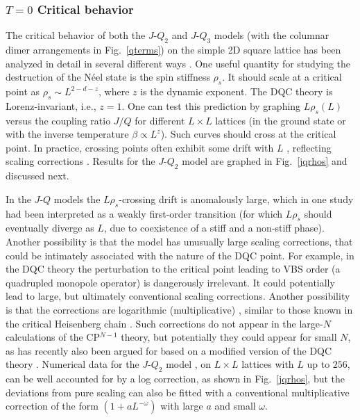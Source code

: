 \documentclass[10pt,pre,aps,twocolumn,showpacs,subscriptaddresses,floatfix]{revtex4}
\begin{document}
\subsubsection{$T=0$ Critical behavior}

The critical behavior of both the $J$-$Q_2$ and $J$-$Q_3$ models (with the columnar dimer arrangements in Fig.~\ref{qterms}) on the simple 2D square 
lattice has been analyzed in detail in several different ways \cite{Sandvik07,Jiang08,kaul2008:jqlgN,melko2008:jq,lou2009:sun,Sandvik10c}. One useful quantity 
for studying the destruction of the N\'eel state is the spin stiffness $\rho_s$. It should scale at a critical point as $\rho_s \sim L^{2-d-z}$, 
where $z$ is the dynamic exponent. The DQC theory is Lorenz-invariant, i.e., $z=1$. One can test this prediction by graphing 
$L\rho_s(L)$ versus the coupling ratio $J/Q$ for different $L\times L$ lattices (in the ground state or with the inverse temperature $\beta \propto L^z$). 
Such curves should cross at the critical point. In practice, crossing points often exhibit some drift with $L$ \cite{melko2008:jq}, reflecting scaling 
corrections \cite{Sandvik10c}. Results for the $J$-$Q_2$ model are graphed in Fig.~\ref{jqrhos} and discussed next.

In the $J$-$Q$ models the $L\rho_s$-crossing drift is anomalously large, which in one study \cite{Jiang08} had been interpreted as a weakly first-order transition (for which 
$L\rho_s$ should eventually diverge as $L$, due to coexistence of a stiff and a non-stiff phase). Another possibility is that the model has unusually
large scaling corrections, that could be intimately associated with the nature of the DQC point. For example, in the DQC theory the perturbation to the 
critical point leading to VBS order (a quadrupled monopole operator) is dangerously irrelevant. It could potentially lead to large, but ultimately conventional
scaling corrections. Another possibility is that the corrections are logarithmic (multiplicative) \cite{Sandvik10c,banerjee2010:log}, similar to those known 
in the critical Heisenberg chain \cite{Giamarchi89}. Such corrections do not appear in the large-$N$ calculations of the CP$^{N-1}$ theory, but potentially they could 
appear for small $N$, as has recently also been argued for based on a modified version of the DQC theory \cite{Nogueira11}. Numerical data for the $J$-$Q_2$ 
model \cite{Sandvik10c}, on $L\times L$ lattices with $L$ up to $256$, can be well accounted for by a log correction, as shown in Fig.~\ref{jqrhos}, but the 
deviations from pure scaling can also be fitted with a conventional multiplicative correction of the form $(1+aL^{-\omega})$ with large $a$ and small $\omega$.
\end{document}

